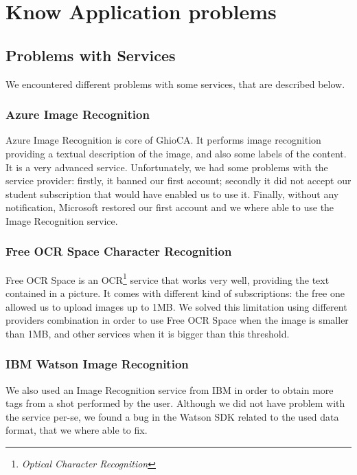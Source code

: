 \section{Know Application problems}

\subsection{Problems with Services}

We encountered different problems with some services, that are described below.

\subsubsection{Azure Image Recognition}

Azure Image Recognition is core of GhioCA. It performs image 
recognition providing a textual description of the image, and also some labels
of the content. It is a very advanced service. Unfortunately, we had some problems
with the service provider: firstly, it banned our first account; secondly it did
not accept our student subscription that would have enabled us to use it.
Finally, without any notification, Microsoft restored our first account and we
where able to use the Image Recognition service.

\subsubsection{Free OCR Space Character Recognition}

Free OCR Space is an OCR\footnote{\textit{Optical Character 
Recognition}} service that works very well, providing the text contained in a picture.
It comes with different kind of subscriptions: the free one allowed us to upload
images up to 1MB. 
We solved this limitation using different providers combination in order to use
Free OCR Space when the image is smaller than 1MB, and other services 
when it is bigger than this threshold. %

\subsubsection{IBM Watson Image Recognition}

We also used an Image Recognition service from IBM in order to obtain more tags
from a shot performed by the user. %
Although we did not have problem with the service per-se, we found a bug in the 
Watson SDK related to the  used data format, that we where able to fix. %

